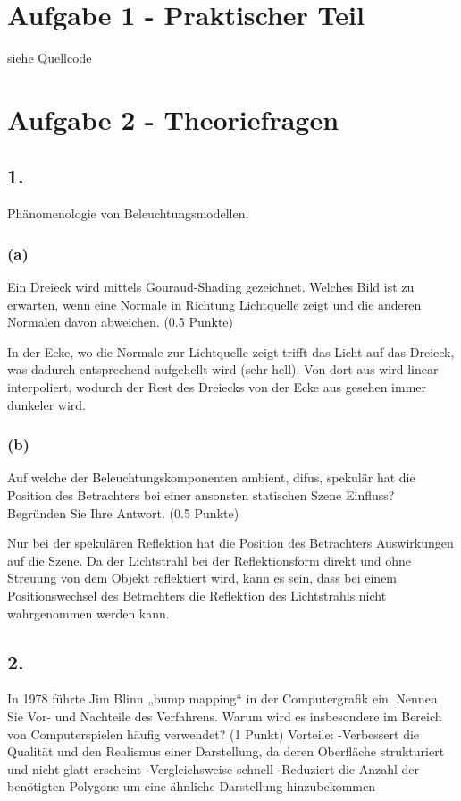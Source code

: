 \documentclass[12pt]{scrreprt}
\begin{document}


\chapter*{Aufgabe 1 - Praktischer Teil}

siehe Quellcode

\chapter*{Aufgabe 2 - Theoriefragen}
\section*{1.}
Phänomenologie von Beleuchtungsmodellen.
\subsection*{(a)}
Ein Dreieck wird mittels Gouraud-Shading gezeichnet. Welches Bild ist zu erwarten, wenn eine Normale in Richtung Lichtquelle zeigt und die anderen Normalen davon abweichen. (0.5 Punkte)

In der Ecke, wo die Normale zur Lichtquelle zeigt trifft das Licht auf das Dreieck, was dadurch entsprechend aufgehellt wird (sehr hell). Von dort aus wird linear interpoliert, wodurch der Rest des Dreiecks von der Ecke aus gesehen immer dunkeler wird.

\subsection*{(b)}
Auf welche der Beleuchtungskomponenten ambient, difus, spekulär hat die Position des Betrachters bei einer ansonsten statischen Szene Einfluss? Begründen Sie Ihre Antwort. (0.5 Punkte)

Nur bei der spekulären Reflektion hat die Position des Betrachters Auswirkungen auf die Szene. Da der Lichtstrahl bei der Reflektionsform direkt und ohne Streuung von dem Objekt reflektiert wird, kann es sein, dass bei einem Positionswechsel des Betrachters die Reflektion des Lichtstrahls nicht wahrgenommen werden kann.

\section*{2.}
In 1978 führte Jim Blinn „bump mapping“ in der Computergrafik ein. Nennen Sie Vor- und Nachteile des Verfahrens. Warum wird es insbesondere im Bereich von Computerspielen häufig verwendet? (1 Punkt)
Vorteile:
-Verbessert die Qualität und den Realismus einer Darstellung, da deren Oberfläche strukturiert und nicht glatt erscheint
-Vergleichsweise schnell
-Reduziert die Anzahl der benötigten Polygone um eine ähnliche Darstellung hinzubekommen
\end{document}
